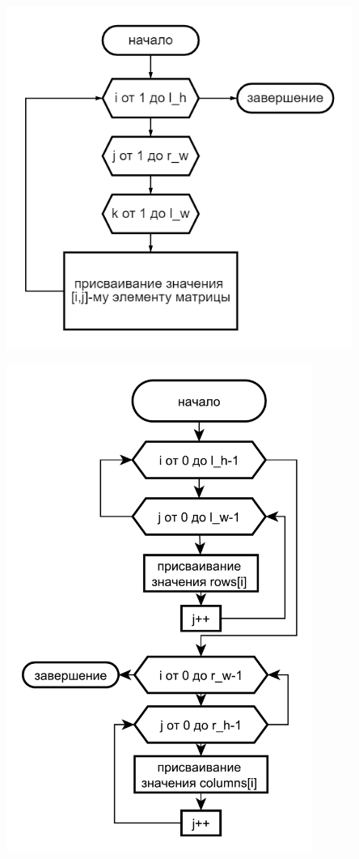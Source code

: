 \documentclass[14pt]{article}
\begin{document}
	\begin{center}
		
		\includegraphics[width = 0.85\textwidth]{diagram_2}
		\label{fig:label2}
		
		\includegraphics[width = 0.75\textwidth, height = 0.9\textheight]{flows_3}
		\label{fig:label3}
		

\end{center}
\end{document}
